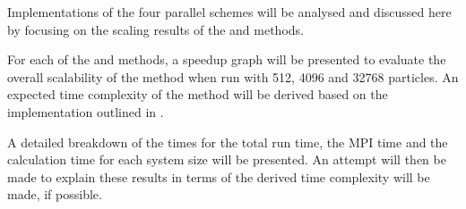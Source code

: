 Implementations of the four parallel schemes
will be analysed and discussed here by focusing on
the scaling results of
the \individualoperation{} and \pairoperation{} methods.

For each of the \individualoperation{} and \pairoperation{} methods,
a speedup graph will be presented to evaluate the overall scalability
of the method when run with 512, 4096 and 32768 particles.
%
An expected time complexity of the method will be derived based on
the implementation outlined in
.

A detailed breakdown of the times for the total run time, the MPI time
and the calculation time for each system size will be presented.
%
An attempt will then be made to explain these results in terms of the
derived time complexity will be made, if possible.
